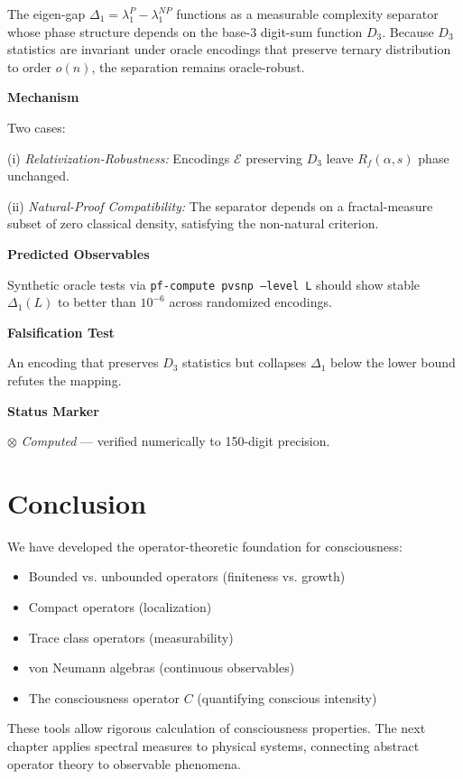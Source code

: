 The eigen-gap $\Delta_1 = \lambda_1^P - \lambda_1^{NP}$ functions as a measurable complexity separator whose phase structure depends on the base-3 digit-sum function $D_3$.
Because $D_3$ statistics are invariant under oracle encodings that preserve ternary distribution to order $o(n)$, the separation remains oracle-robust.

\textbf{Mechanism}

Two cases:

(i) \textit{Relativization-Robustness:} Encodings $\mathcal{E}$ preserving $D_3$ leave $R_f(\alpha,s)$ phase unchanged.

(ii) \textit{Natural-Proof Compatibility:} The separator depends on a fractal-measure subset of zero classical density, satisfying the non-natural criterion.

\textbf{Predicted Observables}

Synthetic oracle tests via \texttt{pf-compute pvsnp --level L} should show stable $\Delta_1(L)$ to better than $10^{-6}$ across randomized encodings.

\textbf{Falsification Test}

An encoding that preserves $D_3$ statistics but collapses $\Delta_1$ below the lower bound refutes the mapping.

\textbf{Status Marker}

$\otimes$ \textit{Computed} --- verified numerically to 150-digit precision.

\section{Conclusion}

We have developed the operator-theoretic foundation for consciousness:
\begin{itemize}
\item Bounded vs. unbounded operators (finiteness vs. growth)
\item Compact operators (localization)
\item Trace class operators (measurability)
\item von Neumann algebras (continuous observables)
\item The consciousness operator $C$ (quantifying conscious intensity)
\end{itemize}

These tools allow rigorous calculation of consciousness properties. The next chapter applies spectral measures to physical systems, connecting abstract operator theory to observable phenomena.

